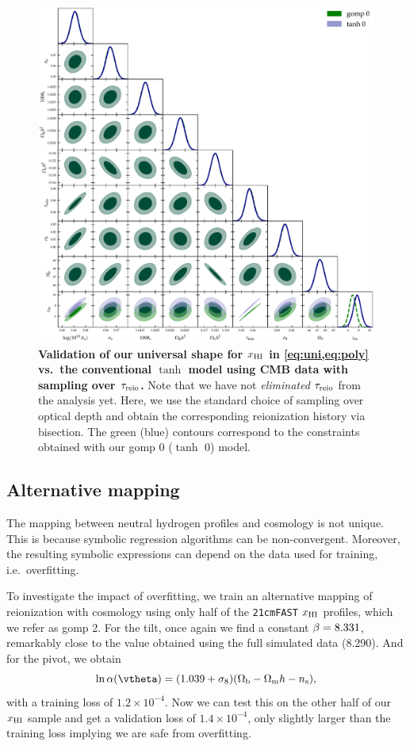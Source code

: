 \begin{figure}[tb]
\centering
\includegraphics[width=\linewidth]{figs/gomp_tanh_triangle_tau.pdf}
\caption{\textbf{Validation of our universal shape for $x_{\mathrm{HI}}$ in \cref{eq:uni,eq:poly} vs.\ the
conventional $\tanh$ model using CMB data with sampling over $\tau_{\mathrm{reio}}$.}
Note that we have not \emph{eliminated} $\tau_{\mathrm{reio}}$ from the analysis
yet. Here, we use the standard choice of sampling
over optical depth and obtain the corresponding reionization history via bisection.
The green (blue) contours correspond to the constraints obtained with
our gomp 0 ($\tanh$ 0) model.}
\label{fig:tg}
\end{figure}

\subsection*{Alternative mapping}
\label{ssec:0226}

The mapping between neutral hydrogen profiles and cosmology is not
unique.
This is because symbolic regression algorithms can be non-convergent.
Moreover, the resulting symbolic expressions can depend on the data used
for training, i.e.\ overfitting.

To investigate the impact of overfitting, we train an alternative
mapping of reionization with cosmology using only half of the
\texttt{21cmFAST} $x_{\mathrm{HI}}$ profiles, which we refer as gomp 2.
For the tilt, once again we find a constant $\beta = 8.331$, remarkably
close to the value obtained using the full simulated data (8.290).
And for the pivot, we obtain
%
\begin{equation}
\label{eq:SR0226}
\ln\ap(\vtheta) = (1.039 + \sigma_8) (\Omegab - \Omegam h - \ns),
\end{equation}
%
with a training loss of $1.2 \times 10^{-4}$.
Now we can test this on the other half of our $x_{\mathrm{HI}}$ sample and get a
validation loss of $1.4 \times 10^{-4}$, only slightly larger than the
training loss implying we are safe from overfitting.

